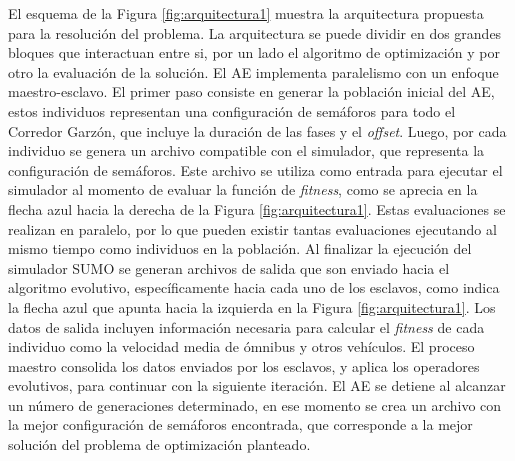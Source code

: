 El esquema de la Figura \ref{fig:arquitectura1}  muestra la arquitectura propuesta para la resolución del problema. La arquitectura se puede dividir en dos grandes bloques que interactuan entre si, por un lado el algoritmo de optimización y por otro la evaluación de la solución. El AE implementa paralelismo con un enfoque maestro-esclavo. El primer paso consiste en generar la población inicial del AE, estos individuos representan una configuración de semáforos para todo el Corredor Garzón, que incluye la duración de las fases y el \emph{offset}. Luego, por cada individuo se genera un archivo compatible con el simulador, que representa la configuración de semáforos. Este archivo se utiliza como entrada para ejecutar el simulador al momento de evaluar la función de \emph{fitness}, como se aprecia en la flecha azul hacia la derecha de la Figura \ref{fig:arquitectura1}. Estas evaluaciones se realizan en paralelo, por lo que pueden existir tantas evaluaciones ejecutando al mismo tiempo como individuos en la población. Al finalizar la ejecución del simulador SUMO se generan archivos de salida que son enviado hacia el algoritmo evolutivo, específicamente hacia cada uno de los esclavos, como indica la flecha azul que apunta hacia la izquierda en la Figura \ref{fig:arquitectura1}. Los datos de salida incluyen información necesaria para calcular el \emph{fitness} de cada individuo como la velocidad media de ómnibus y otros vehículos. El proceso maestro consolida los datos enviados por los esclavos, y aplica los operadores evolutivos, para continuar con la siguiente iteración. El AE se detiene al alcanzar un número de generaciones determinado, en ese momento se crea un archivo con la mejor configuración de semáforos encontrada, que corresponde a la mejor solución del problema de optimización planteado. 






